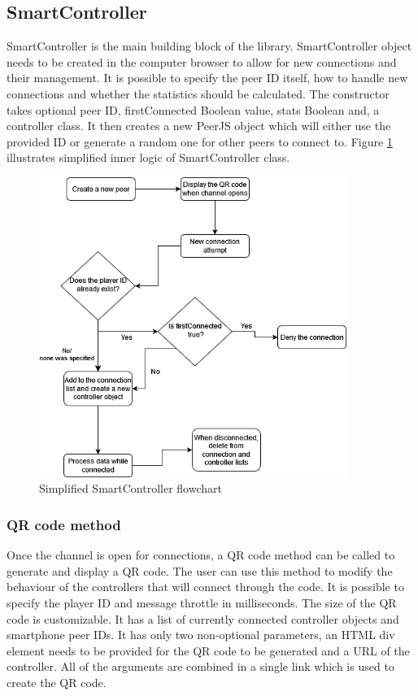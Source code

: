 \documentclass{l4proj}
\begin{document}
\subsection{SmartController}
SmartController is the main building block of the library. SmartController object needs to be created in the computer browser to allow for new connections and their management. It is possible to specify the peer ID itself, how to handle new connections and whether the statistics should be calculated. The constructor takes optional peer ID, firstConnected Boolean value, stats Boolean and, a controller class. It then creates a new PeerJS object which will either use the provided ID or generate a random one for other peers to connect to. Figure \ref{fig:flow} illustrates simplified inner logic of SmartController class.\par 

\begin{figure}[h!]
    \centering
    \includegraphics[width = 10cm]{./images/statediagram.png}
    \caption{Simplified SmartController flowchart}
    \label{fig:flow}
\end{figure}

\subsubsection{QR code method}
Once the channel is open for connections, a QR code method can be called to generate and display a QR code. The user can use this method to modify the behaviour of the controllers that will connect through the code. It is possible to specify the player ID and message throttle in milliseconds. The size of the QR code is customizable. It has a list of currently connected controller objects and smartphone peer IDs. It has only two non-optional parameters, an HTML div element needs to be provided for the QR code to be generated and a URL of the controller. All of the arguments are combined in a single link which is used to create the QR code. \par 
\end{document}

